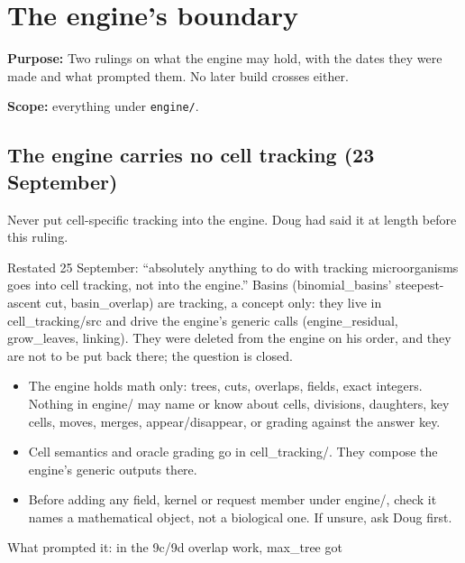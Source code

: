 \chapter{\texorpdfstring{The engine's boundary}{The engine's boundary}}
\label{chap:engine-boundary}

\textbf{Purpose:} Two rulings on what the engine may hold, with the dates they were made and what prompted them. No later build crosses either.

\textbf{Scope:} everything under \texttt{engine/\allowbreak{}}.

\section{\texorpdfstring{The engine carries no cell tracking (23 September)}{The engine carries no cell tracking (23 September)}}

Never put cell-specific tracking into the engine. Doug had said it at length before this ruling.

Restated 25 September: “absolutely anything to do with tracking microorganisms goes into cell tracking, not into the engine.” Basins (binomial\_\allowbreak{}basins' steepest-ascent cut, basin\_\allowbreak{}overlap) are tracking, a concept only: they live in cell\_\allowbreak{}tracking/src and drive the engine's generic calls (engine\_\allowbreak{}residual, grow\_\allowbreak{}leaves, linking). They were deleted from the engine on his order, and they are not to be put back there; the question is closed.

\begin{itemize}
\item The engine holds math only: trees, cuts, overlaps, fields, exact integers. Nothing in engine/ may name or know about cells, divisions, daughters, key cells, moves, merges, appear/disappear, or grading against the answer key.
\item Cell semantics and oracle grading go in cell\_\allowbreak{}tracking/. They compose the engine's generic outputs there.
\item Before adding any field, kernel or request member under engine/, check it names a mathematical object, not a biological one. If unsure, ask Doug first.
\end{itemize}

What prompted it: in the 9c/9d overlap work, max\_\allowbreak{}tree got

